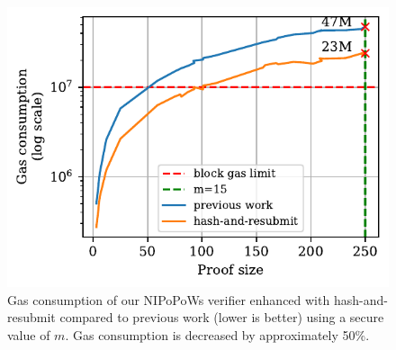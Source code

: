\begin{figure}[!h]
    \begin{center}
        \includegraphics[width=0.9\columnwidth]{figures/har-nipopows.pdf}
    \end{center}
\vspace*{-5mm}
    \caption{Gas consumption of our NIPoPoWs verifier enhanced with hash-and-resubmit
        compared to previous work (lower is better) using a secure value of $m$.
        Gas consumption is decreased by approximately 50\%.}
    \label{fig:har-nipopow}
\vspace*{-5mm}
\end{figure}
